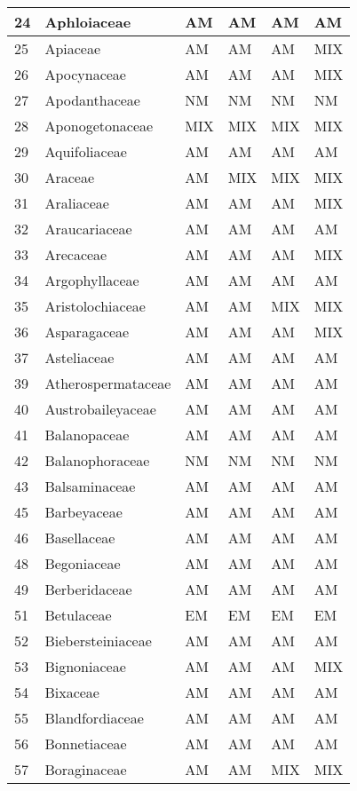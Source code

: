 \documentclass[]{article}
\begin{document}
\begin{longtable}{l|l|l|l|l|l}
24 & Aphloiaceae & AM & AM & AM & AM\\
\hline
25 & Apiaceae & AM & AM & AM & MIX\\
\hline
26 & Apocynaceae & AM & AM & AM & MIX\\
\hline
27 & Apodanthaceae & NM & NM & NM & NM\\
\hline
28 & Aponogetonaceae & MIX & MIX & MIX & MIX\\
\hline
29 & Aquifoliaceae & AM & AM & AM & AM\\
\hline
30 & Araceae & AM & MIX & MIX & MIX\\
\hline
31 & Araliaceae & AM & AM & AM & MIX\\
\hline
32 & Araucariaceae & AM & AM & AM & AM\\
\hline
33 & Arecaceae & AM & AM & AM & MIX\\
\hline
34 & Argophyllaceae & AM & AM & AM & AM\\
\hline
35 & Aristolochiaceae & AM & AM & MIX & MIX\\
\hline
36 & Asparagaceae & AM & AM & AM & MIX\\
\hline
37 & Asteliaceae & AM & AM & AM & AM\\
\hline
39 & Atherospermataceae & AM & AM & AM & AM\\
\hline
40 & Austrobaileyaceae & AM & AM & AM & AM\\
\hline
41 & Balanopaceae & AM & AM & AM & AM\\
\hline
42 & Balanophoraceae & NM & NM & NM & NM\\
\hline
43 & Balsaminaceae & AM & AM & AM & AM\\
\hline
45 & Barbeyaceae & AM & AM & AM & AM\\
\hline
46 & Basellaceae & AM & AM & AM & AM\\
\hline
48 & Begoniaceae & AM & AM & AM & AM\\
\hline
49 & Berberidaceae & AM & AM & AM & AM\\
\hline
51 & Betulaceae & EM & EM & EM & EM\\
\hline
52 & Biebersteiniaceae & AM & AM & AM & AM\\
\hline
53 & Bignoniaceae & AM & AM & AM & MIX\\
\hline
54 & Bixaceae & AM & AM & AM & AM\\
\hline
55 & Blandfordiaceae & AM & AM & AM & AM\\
\hline
56 & Bonnetiaceae & AM & AM & AM & AM\\
\hline
57 & Boraginaceae & AM & AM & MIX & MIX\\

\end{longtable}
\end{document}
